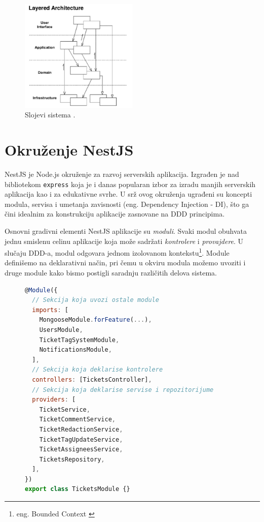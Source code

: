 \documentclass[12pt,oneside]{memoir}
\begin{document}
\begin{figure}[h]
  \centering
  \includegraphics[width=0.5\textwidth]{docs/images/ch_2/DDD-Layered-Architecture-2.png} 
  \caption{Slojevi sistema \cite{dddfull}.}
  \label{fig:sample}
\end{figure}

\section{Okruženje NestJS}

NestJS \cite{nestjsdocs} je Node.js okruženje za razvoj serverskih aplikacija. Izgrađen je nad bibliotekom \verb|express| \cite{expressjsdocs} koja je i danas popularan izbor za izradu manjih serverskih aplikacija kao i za edukativne svrhe.  U srž ovog okruženja ugrađeni su koncepti modula, servisa i umetanja zavisnosti (eng. Dependency Injection - DI), što ga čini idealnim za konstrukciju aplikacije zasnovane na DDD principima.

Osnovni gradivni elementi NestJS aplikacije su \textit{moduli}. Svaki modul obuhvata jednu smislenu celinu aplikacije koja može sadržati \textit{kontrolere} i \textit{provajdere}. U slučaju DDD-a, modul odgovara jednom izolovanom kontekstu\footnote{eng. Bounded Context \cite{dddfull}}. Module definišemo na deklarativni način, pri čemu u okviru modula možemo uvoziti i druge module kako bismo postigli saradnju različitih delova sistema.

\begin{figure}[h]
\begin{lstlisting}[language=JavaScript, style=ES6, caption={Deklaracija modula za tikete.}]
@Module({
  // Sekcija koja uvozi ostale module
  imports: [
    MongooseModule.forFeature(...),
    UsersModule,
    TicketTagSystemModule,
    NotificationsModule,
  ],
  // Sekcija koja deklarise kontrolere
  controllers: [TicketsController],
  // Sekcija koja deklarise servise i repozitorijume
  providers: [
    TicketService,
    TicketCommentService,
    TicketRedactionService,
    TicketTagUpdateService,
    TicketAssigneesService,
    TicketsRepository,
  ],
})
export class TicketsModule {}
\end{lstlisting}
\end{figure}
\end{document}
